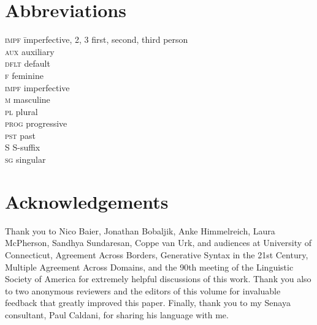\documentclass[output=paper
,modfonts
,nonflat]{langsci/langscibook}
\begin{document}
\section*{Abbreviations}

\begin{multicols}{2}
	\begin{tabbing}
		\textsc{impf}\hspace{5mm} \= imperfective, 2, 3 \> first, second, third person\\
\textsc{aux} \> auxiliary\\
\textsc{dflt} \> default\\
 \textsc{f} \> feminine\\
\textsc{impf} \> imperfective\\
 \textsc{m} \> masculine\\
 \textsc{pl} \> plural\\
 \textsc{prog} \> progressive\\
 \textsc{pst} \> past\\
 S \> S-suffix\\
 \textsc{sg} \> singular\\
	\end{tabbing} 
\end{multicols}

\section*{Acknowledgements}

Thank you to Nico Baier, Jonathan Bobaljik, Anke Himmelreich, Laura McPherson, Sandhya Sundaresan, Coppe van Urk, and audiences at University of Connecticut, Agreement Across Borders, Generative Syntax in the 21st Century, Multiple Agreement Across Domains, and the 90th meeting of the Linguistic Society of America for extremely helpful discussions of this work. Thank you also to two anonymous reviewers and the editors of this volume for invaluable feedback that greatly improved this paper. Finally, thank you to my Senaya consultant, Paul Caldani, for sharing his language with me.

{\sloppy\printbibliography[heading=subbibliography,notkeyword=this]}
\end{document}
